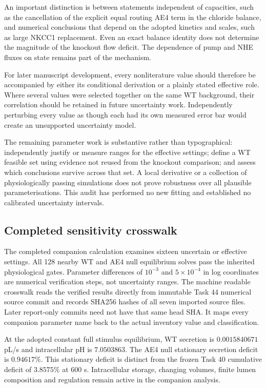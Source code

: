 \documentclass[11pt,a4paper]{article}
\begin{document}
An important distinction is between statements independent of capacities, such as the cancellation of the explicit equal routing AE4 term in the chloride balance, and numerical conclusions that depend on the adopted kinetics and scales, such as large NKCC1 replacement. Even an exact balance identity does not determine the magnitude of the knockout flow deficit. The dependence of pump and NHE fluxes on state remains part of the mechanism.

For later manuscript development, every nonliterature value should therefore be accompanied by either its conditional derivation or a plainly stated effective role. Where several values were selected together on the same WT background, their correlation should be retained in future uncertainty work. Independently perturbing every value as though each had its own measured error bar would create an unsupported uncertainty model.

The remaining parameter work is substantive rather than typographical: independently justify or measure ranges for the effective settings; define a WT feasible set using evidence not reused from the knockout comparison; and assess which conclusions survive across that set. A local derivative or a collection of physiologically passing simulations does not prove robustness over all plausible parameterisations. This audit has performed no new fitting and established no calibrated uncertainty intervals.

\subsection{Completed sensitivity crosswalk}
The completed companion calculation examines sixteen uncertain or effective settings. All 128 nearby WT and AE4 null equilibrium solves pass the inherited physiological gates. Parameter differences of $10^{-3}$ and $5\times10^{-4}$ in log coordinates are numerical verification steps, not uncertainty ranges. The machine readable crosswalk reads the verified results directly from immutable Task 44 numerical source commit \texttt{\SensitivitySourceCommit} and records SHA256 hashes of all seven imported source files. Later report-only commits need not have that same head SHA. It maps every companion parameter name back to the actual inventory value and classification.

At the adopted constant full stimulus equilibrium, WT secretion is $0.0015840671$ pL/s and intracellular pH is $7.0503863$. The AE4 null stationary secretion deficit is $0.94617\%$. This stationary deficit is distinct from the frozen Task 40 cumulative deficit of $3.8575\%$ at 600 s. Intracellular storage, changing volumes, finite lumen composition and regulation remain active in the companion analysis.
\end{document}
